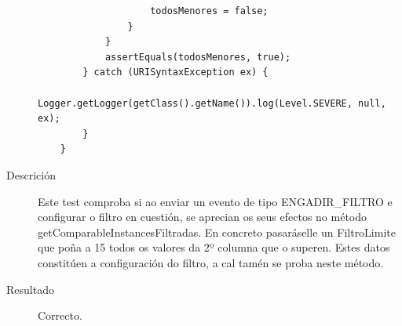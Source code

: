 \begin{description}
\begin{lstlisting}
                    todosMenores = false;
                }
            }
            assertEquals(todosMenores, true);
        } catch (URISyntaxException ex) {
            Logger.getLogger(getClass().getName()).log(Level.SEVERE, null, ex);
        }
    }
\end{lstlisting}
\item[Descrición]
Este test comproba si ao enviar un evento de tipo ENGADIR\_FILTRO e configurar o filtro en cuestión, se aprecian os seus efectos no método getComparableInstancesFiltradas. En concreto pasaráselle un FiltroLimite que poña a 15 todos os valores da 2º columna que o superen. Estes datos constitúen a configuración do filtro, a cal tamén se proba neste método.
\item[Resultado]
Correcto.
\end{description}

